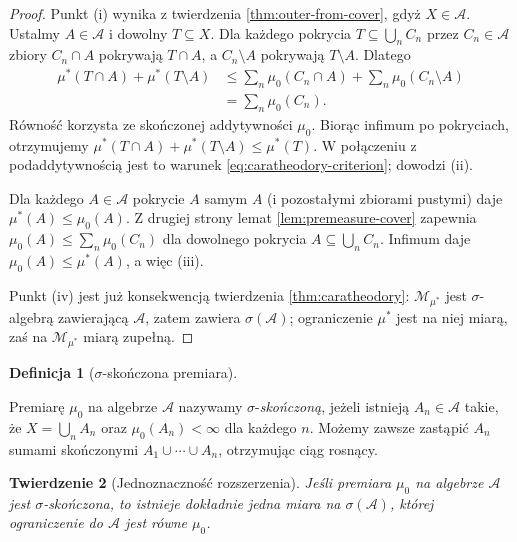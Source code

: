 \documentclass[11pt,a4paper,oneside]{book}
\numberwithin{equation}{chapter}
\theoremstyle{plain}
\newtheorem{twierdzenie}{Twierdzenie}[chapter]
\theoremstyle{definition}
\newtheorem{definicja}[twierdzenie]{Definicja}
\theoremstyle{remark}
\begin{document}
\begin{proof}
Punkt (i) wynika z twierdzenia \ref{thm:outer-from-cover},
gdyż $X\in\mathcal A$.
Ustalmy $A\in\mathcal A$ i dowolny $T\subseteq X$.
Dla każdego pokrycia $T\subseteq\bigcup_nC_n$ przez
$C_n\in\mathcal A$ zbiory $C_n\cap A$ pokrywają $T\cap A$,
a $C_n\setminus A$ pokrywają $T\setminus A$. Dlatego
\begin{align*}
\mu^*(T\cap A)+\mu^*(T\setminus A)
&\le\sum_n\mu_0(C_n\cap A)+\sum_n\mu_0(C_n\setminus A)\\
&=\sum_n\mu_0(C_n).
\end{align*}
Równość korzysta ze skończonej addytywności $\mu_0$.
Biorąc infimum po pokryciach, otrzymujemy
$\mu^*(T\cap A)+\mu^*(T\setminus A)\le\mu^*(T)$.
W połączeniu z podaddytywnością jest to warunek
\eqref{eq:caratheodory-criterion}; dowodzi (ii).

Dla każdego $A\in\mathcal A$ pokrycie $A$ samym $A$
(i pozostałymi zbiorami pustymi) daje
$\mu^*(A)\le\mu_0(A)$. Z drugiej strony
lemat \ref{lem:premeasure-cover} zapewnia
$\mu_0(A)\le\sum_n\mu_0(C_n)$ dla dowolnego pokrycia
$A\subseteq\bigcup_nC_n$. Infimum daje
$\mu_0(A)\le\mu^*(A)$, a więc (iii).

Punkt (iv) jest już konsekwencją twierdzenia
\ref{thm:caratheodory}: $\mathcal M_{\mu^*}$ jest
$\sigma$-algebrą zawierającą $\mathcal A$, zatem
zawiera $\sigma(\mathcal A)$; ograniczenie $\mu^*$
jest na niej miarą, zaś na $\mathcal M_{\mu^*}$ miarą zupełną.
\end{proof}

\begin{definicja}[\texorpdfstring{$\sigma$}{sigma}-skończona premiara]\label{idx:03:definicja:09}

Premiarę $\mu_0$ na algebrze $\mathcal A$ nazywamy
$\sigma$-\emph{skończoną}, jeżeli istnieją
$A_n\in\mathcal A$ takie, że $X=\bigcup_nA_n$ oraz
$\mu_0(A_n)<\infty$ dla każdego $n$.
Możemy zawsze zastąpić $A_n$ sumami skończonymi
$A_1\cup\cdots\cup A_n$, otrzymując ciąg rosnący.
\end{definicja}

\begin{twierdzenie}[Jednoznaczność rozszerzenia]
\label{thm:extension-uniqueness}
Jeśli premiara $\mu_0$ na algebrze $\mathcal A$ jest
$\sigma$-skończona, to istnieje dokładnie jedna miara
na $\sigma(\mathcal A)$, której ograniczenie do
$\mathcal A$ jest równe $\mu_0$.
\end{twierdzenie}
\end{document}
